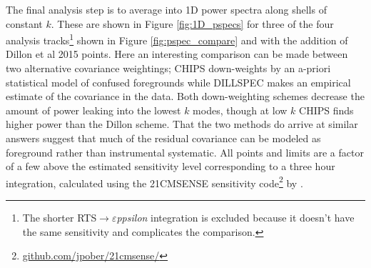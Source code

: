 \documentclass[twolcolumn,iop]{emulateapj}
\def\eppsilon{{\it $\varepsilon$ppsilon}}
\def\empirical{DILLSPEC}
\def\dilloncite{Dillon et al 2015 }
\begin{document}
The final analysis step is to average into 1D power spectra along shells of constant $k$. These are shown in Figure \ref{fig:1D_pspecs} for three of the four analysis tracks\footnote{The shorter RTS$\to$\eppsilon{} integration is excluded because it doesn't have the same sensitivity and complicates the comparison.} shown in Figure \ref{fig:pspec_compare} and with the addition of \dilloncite{} points. Here an interesting comparison can be made between two alternative covariance weightings; CHIPS down-weights by an a-priori statistical model of confused foregrounds while \empirical{} makes an empirical estimate of the covariance in the data. Both down-weighting schemes  decrease the amount of power leaking into the lowest $k$ modes, though at low $k$ CHIPS finds higher power than the Dillon scheme.  That the two methods do arrive at similar answers suggest that much of the residual covariance can be modeled as foreground rather than instrumental systematic. All points and limits are a factor of a few above the estimated sensitivity level corresponding to a three hour integration, calculated using the 21CMSENSE sensitivity code\footnote{\url{github.com/jpober/21cmsense/}} by \cite{Pober:2014p10390}.





\end{document}
